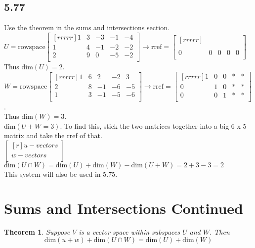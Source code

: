 \documentclass{report}
\theoremstyle{plain}
\newtheorem*{thrm}{Theorem}
\theoremstyle{definition}
\theoremstyle{plain}
\begin{document}
\subsection{5.77}
Use the theorem in the sums and intersections section.
$U=\mathrm{rowspace}\begin{bmatrix}[rrrrr]1&3&-3&-1&-4\\1&4&-1&-2&-2\\2&9&0&-5&-2\\\end{bmatrix} \rightarrow \mathrm{rref}=\begin{bmatrix}[rrrrr]{}\\ {}\\ 0&0&0&0&0\\\end{bmatrix}$\\
Thus $\mathrm{dim}(U)=2$.\\
$W=\mathrm{rowspace}\begin{bmatrix}[rrrrr]1&6&2&-2&3\\2&8&-1&-6&-5\\1&3&-1&-5&-6\\\end{bmatrix} \rightarrow \mathrm{rref}=\begin{bmatrix}[rrrrr]1&0&0&*&*\\0&1&0&*&*\\0&0&1&*&*\\\end{bmatrix}$.\\
Thus $\mathrm{dim}(W)=3$.\\
$\mathrm{dim}(U+W=3)$. To find this, stick the two matrices together into a big 6 x 5 matrix and take the rref of that.\\
$\begin{bmatrix}[r]u-vectors\\ \hline w-vectors\\\end{bmatrix}$\\
$\mathrm{dim}(U\cap W) = \mathrm{dim}(U) + \mathrm{dim}(W) - \mathrm{dim}(U+W) = 2+3-3=2$\\
This system will also be used in 5.75.

\section{Sums and Intersections Continued}
\begin{thrm}
Suppose $V$ is a vector space within subspaces $U$ and $W$. Then 
\[ \mathrm{dim}(u+w)+\mathrm{dim}(U\cap W) = \mathrm{dim}(U)+\mathrm{dim}(W) \]
\end{thrm}
\end{document}
